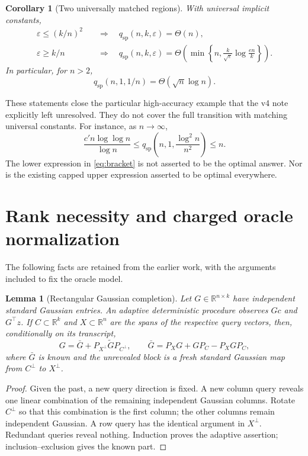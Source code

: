 \documentclass[11pt]{article}
\numberwithin{equation}{section}
\newtheorem{lemma}[theorem]{Lemma}
\newtheorem{corollary}[theorem]{Corollary}
\theoremstyle{remark}\newtheorem{remark}[theorem]{Remark}
\newcommand{\R}{\mathbb R}
\newcommand{\eps}{\varepsilon}
\newcommand{\qsp}{q_{\mathrm{sp}}}
\begin{document}
\begin{corollary}[Two universally matched regions]\label{cor:regions}
With universal implicit constants,
\begin{align}
\eps\le(k/n)^2&\quad\Longrightarrow\quad \qsp(n,k,\eps)=\Theta(n),\label{eq:tiny}\\
\eps\ge k/n&\quad\Longrightarrow\quad
\qsp(n,k,\eps)=\Theta\!\left(\min\left\{n,\frac{k}{\sqrt\eps}\log\frac{en}{k}\right\}\right).
\label{eq:moderate}
\end{align}
In particular, for $n>2$,
\begin{equation}\label{eq:closedexample}
\qsp(n,1,1/n)=\Theta(\sqrt n\log n).
\end{equation}
\end{corollary}
These statements close the particular high-accuracy example that the v4 note explicitly left unresolved. They do not cover the full transition with matching universal constants. For instance, as $n\to\infty$,
\begin{equation}\label{eq:remainingexample}
\frac{c' n\log\log n}{\log n}
\le\qsp\!\left(n,1,\frac{\log^2 n}{n^2}\right)\le n.
\end{equation}
The lower expression in \eqref{eq:bracket} is not asserted to be the optimal answer. Nor is the existing capped upper expression asserted to be optimal everywhere.

\section{Rank necessity and charged oracle normalization}\label{sec:rank}
The following facts are retained from the earlier work, with the arguments included to fix the oracle model.

\begin{lemma}[Rectangular Gaussian completion]\label{lem:rectcompletion}
Let $G\in\R^{n\times k}$ have independent standard Gaussian entries. An adaptive deterministic procedure observes $Gc$ and $G^\top z$. If $C\subset\R^k$ and $X\subset\R^n$ are the spans of the respective query vectors, then, conditionally on its transcript,
\[
G=\bar G+P_{X^\perp}\widetilde G P_{C^\perp},\qquad
\bar G=P_XG+GP_C-P_XGP_C,
\]
where $\bar G$ is known and the unrevealed block is a fresh standard Gaussian map from $C^\perp$ to $X^\perp$.
\end{lemma}
\begin{proof}
Given the past, a new query direction is fixed. A new column query reveals one linear combination of the remaining independent Gaussian columns. Rotate $C^\perp$ so that this combination is the first column; the other columns remain independent Gaussian. A row query has the identical argument in $X^\perp$. Redundant queries reveal nothing. Induction proves the adaptive assertion; inclusion--exclusion gives the known part.
\end{proof}
\end{document}
